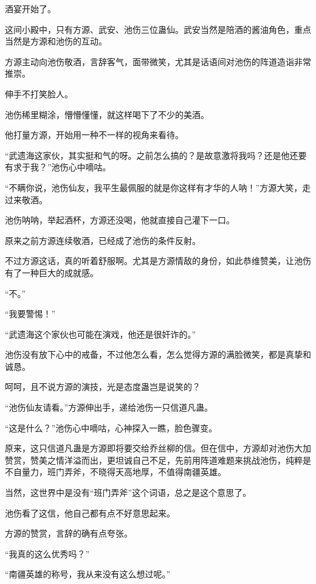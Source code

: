 
\begin{this_body}

酒宴开始了。

这间小殿中，只有方源、武安、池伤三位蛊仙。武安当然是陪酒的酱油角色，重点当然是方源和池伤的互动。

方源主动向池伤敬酒，言辞客气，面带微笑，尤其是话语间对池伤的阵道造诣非常推崇。

伸手不打笑脸人。

池伤稀里糊涂，懵懵懂懂，就这样喝下了不少的美酒。

他打量方源，开始用一种不一样的视角来看待。

“武遗海这家伙，其实挺和气的呀。之前怎么搞的？是故意激将我吗？还是他还要有求于我？”池伤心中嘀咕。

“不瞒你说，池伤仙友，我平生最佩服的就是你这样有才华的人呐！”方源大笑，走过来敬酒。

池伤呐呐，举起酒杯，方源还没喝，他就直接自己灌下一口。

原来之前方源连续敬酒，已经成了池伤的条件反射。

不过方源这话，真的听着舒服啊。尤其是方源情敌的身份，如此恭维赞美，让池伤有了一种巨大的成就感。

“不。”

“我要警惕！”

“武遗海这个家伙也可能在演戏，他还是很奸诈的。”

池伤没有放下心中的戒备，不过他怎么看，怎么觉得方源的满脸微笑，都是真挚和诚恳。

呵呵，且不说方源的演技，光是态度蛊岂是说笑的？

“池伤仙友请看。”方源伸出手，递给池伤一只信道凡蛊。

“这是什么？”池伤心中嘀咕，心神探入一瞧，脸色骤变。

原来，这只信道凡蛊是方源即将要交给乔丝柳的信。但在信中，方源却对池伤大加赞赏，赞美之情洋溢而出，更坦诚自己不足，先前用阵道难题来挑战池伤，纯粹是不自量力，班门弄斧，不晓得天高地厚，不值得南疆英雄。

当然，这世界中是没有“班门弄斧”这个词语，总之是这个意思了。

池伤看了这信，他自己都有点不好意思起来。

方源的赞赏，言辞的确有点夸张。

“我真的这么优秀吗？”

“南疆英雄的称号，我从来没有这么想过呢。”


\end{this_body}
